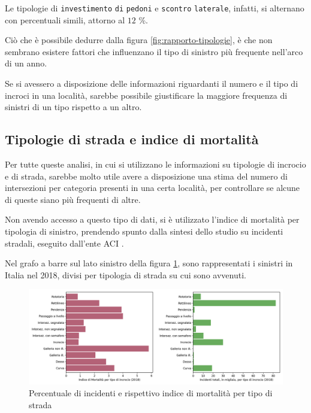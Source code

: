 \documentclass[a4paper,12pt]{report}
\newcommand{\columnstyle}[1]{\texttt{#1}}
\begin{document}
Le tipologie di \columnstyle{investimento} \columnstyle{di} \columnstyle{pedoni} e 
\columnstyle{scontro} \columnstyle{laterale}, 
infatti, si alternano con percentuali simili, attorno al $12$ \%. 

Ciò che è possibile dedurre dalla figura \ref{fig:rapporto-tipologie}, è che non 
sembrano esistere fattori che influenzano il tipo di sinistro più frequente 
nell'arco di un anno.

Se si avessero a disposizione delle informazioni riguardanti il numero e il tipo 
di incroci in una località, sarebbe possibile giustificare 
la maggiore frequenza di sinistri di un tipo rispetto a un altro. 

\subsection{Tipologie di strada e indice di mortalità}

Per tutte queste analisi, in cui si utilizzano le informazioni su tipologie 
di incrocio e di strada, 
sarebbe molto utile avere a disposizione una stima del numero di intersezioni 
per categoria presenti in una certa località, 
per controllare se alcune di queste siano più frequenti di altre. 

Non avendo accesso a questo tipo di dati, si è utilizzato l'indice di 
mortalità per tipologia di sinistro, prendendo spunto dalla sintesi dello 
studio su incidenti stradali, eseguito dall'ente ACI \cite{ACI:2}. 

Nel grafo a barre sul lato sinistro della figura \ref{fig:tipo-intersezioni}, 
sono rappresentati i sinistri in Italia nel 2018, divisi per tipologia 
di strada su cui sono avvenuti. 

\begin{figure}
    \includegraphics[width=\linewidth]{img_unite/intersezioni_indice_mortalita.png}
    \caption{Percentuale di incidenti e rispettivo indice di mortalità per tipo di strada}
    \label{fig:tipo-intersezioni}
\end{figure}
\end{document}
